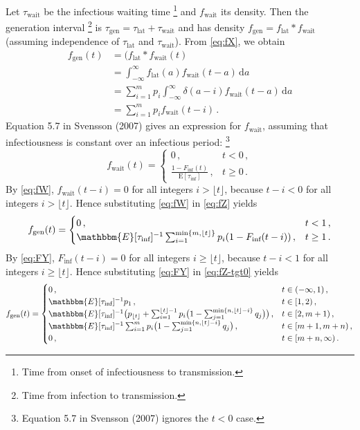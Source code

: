 \documentclass[12pt]{article}
\newcommand{\tlat}{\tau_\text{lat}}
\newcommand{\tinf}{\tau_\text{inf}}
\newcommand{\twait}{\tau_\text{wait}}
\newcommand{\tgen}{\tau_\text{gen}}
\renewcommand{\flat}{f_\text{lat}}
\newcommand{\fwait}{f_\text{wait}}
\newcommand{\fgen}{f_\text{gen}}
\newcommand{\Finf}{F_\text{inf}}
\begin{document}
Let $\twait$ be the infectious waiting time%
\footnote{Time from onset of infectiousness to transmission.}
and $\fwait$ its density. Then the generation interval%
\footnote{Time from infection to transmission.}
is $\tgen = \tlat + \twait$ and has density $\fgen = \flat * \fwait$
(assuming independence of $\tlat$ and $\twait$).
From \eqref{eq:fX}, we obtain
%
\begin{equation}
  \label{eq:fZ}
  \begin{aligned}
    \fgen(t)
    &= (\flat * \fwait(t) \\
    &= \int_{-\infty}^{\infty} \flat(a) \fwait(t - a)\,\text{d}a \\
    &= \sum_{i=1}^{m} p_i \int_{-\infty}^{\infty} \delta(a - i) \fwait(t - a)\,\text{d}a \\
    &= \sum_{i=1}^{m} p_i \fwait(t - i)\,.
  \end{aligned}
\end{equation}
%
Equation 5.7 in Svensson (2007) gives an expression for $\fwait$,
assuming that infectiousness is constant over an infectious period:%
\footnote{Equation 5.7 in Svensson (2007) ignores the $t < 0$ case.}
%
\begin{equation}
  \label{eq:fW}
  \fwait(t) = \begin{cases} 0\,, & t < 0\,, \\ \frac{1 - \Finf(t)}{\mathrm{E}[\tinf]}\,, & t \geq 0\,. \end{cases}
\end{equation}
%
By \eqref{eq:fW}, $\fwait(t - i) = 0$ for all integers
$i > \lfloor t \rfloor$, because $t - i < 0$ for all
integers $i > \lfloor t \rfloor$. Hence substituting
\eqref{eq:fW} in \eqref{eq:fZ} yields
%
\begin{equation}
  \label{eq:fZ-tgt0}
  \fgen(t) = \begin{cases}
    0\,,
      & t < 1\,, \\
    \mathbbm{E}[\tinf]^{-1} \sum_{i=1}^{\min\{m, \lfloor t \rfloor\}} p_i (1 - \Finf(t - i))\,,
      & t \geq 1\,.
  \end{cases}
\end{equation}
%
By \eqref{eq:FY}, $\Finf(t - i) = 0$ for all integers
$i \geq \lfloor t \rfloor$, because $t - i < 1$ for all
integers $i \geq \lfloor t \rfloor$. Hence substituting
\eqref{eq:FY} in \eqref{eq:fZ-tgt0} yields
%
\begin{equation}
  \fgen(t) = \begin{cases}
    0\,,
      & t \in (-\infty,1)\,, \\
    \mathbbm{E}[\tinf]^{-1} p_1\,,
      & t \in [1,2)\,, \\
    \mathbbm{E}[\tinf]^{-1} \big(p_{\lfloor t \rfloor} + \sum_{i=1}^{\lfloor t \rfloor - 1} p_i \big(1 - \sum_{j=1}^{\min\{n,\lfloor t \rfloor - i\}} q_j\big)\big)\,,
      & t \in [2,m+1)\,, \\
    \mathbbm{E}[\tinf]^{-1} \sum_{i=1}^{m} p_i \big(1 - \sum_{j=1}^{\min\{n,\lfloor t \rfloor - i\}} q_j\big)\,,
      & t \in [m+1,m+n)\,, \\
    0\,,
      & t \in [m+n,\infty)\,.
  \end{cases}
\end{equation}
\end{document}
